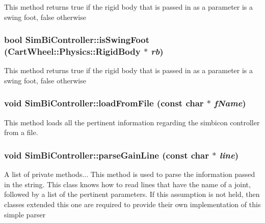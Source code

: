 \label{classCartWheel_1_1Core_1_1SimBiController_a7f1a872f10bd7aaa236212a7f5143786}
This method returns true if the rigid body that is passed in as a parameter is a swing foot, false otherwise \hypertarget{classCartWheel_1_1Core_1_1SimBiController_a5729956eba2d47c641de667feaa8182c}{
\subsubsection[{isSwingFoot}]{\setlength{\rightskip}{0pt plus 5cm}bool SimBiController::isSwingFoot ({\bf CartWheel::Physics::RigidBody} $\ast$ {\em rb})}}
\label{classCartWheel_1_1Core_1_1SimBiController_a5729956eba2d47c641de667feaa8182c}
This method returns true if the rigid body that is passed in as a parameter is a swing foot, false otherwise \hypertarget{classCartWheel_1_1Core_1_1SimBiController_a2c146c079a03b0f5799d4780f5c8ff43}{
\subsubsection[{loadFromFile}]{\setlength{\rightskip}{0pt plus 5cm}void SimBiController::loadFromFile (const char $\ast$ {\em fName})}}
\label{classCartWheel_1_1Core_1_1SimBiController_a2c146c079a03b0f5799d4780f5c8ff43}
This method loads all the pertinent information regarding the simbicon controller from a file. \hypertarget{classCartWheel_1_1Core_1_1SimBiController_a9508198fc8cc2f2ceb9c1edef8ed0a45}{
\subsubsection[{parseGainLine}]{\setlength{\rightskip}{0pt plus 5cm}void SimBiController::parseGainLine (const char $\ast$ {\em line})}}
\label{classCartWheel_1_1Core_1_1SimBiController_a9508198fc8cc2f2ceb9c1edef8ed0a45}
A list of private methods... This method is used to parse the information passed in the string. This class knows how to read lines that have the name of a joint, followed by a list of the pertinent parameters. If this assumption is not held, then classes extended this one are required to provide their own implementation of this simple parser

